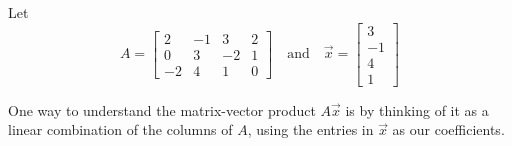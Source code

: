 \documentclass{ximera}
\begin{document}
\begin{example}\label{exp:matrixvectormultdef}
Let $$A=\begin{bmatrix}2&-1&3&2\\0&3&-2&1\\-2&4&1&0\end{bmatrix}\quad\text{and}\quad \vec{x}=\begin{bmatrix}3\\-1\\4\\1\end{bmatrix}$$ %





One way to understand the matrix-vector product $A\vec{x}$ is by thinking of it as a linear combination of the columns of $A$, using the entries in $\vec{x}$ as our coefficients.  %




\end{example}
\end{document}
